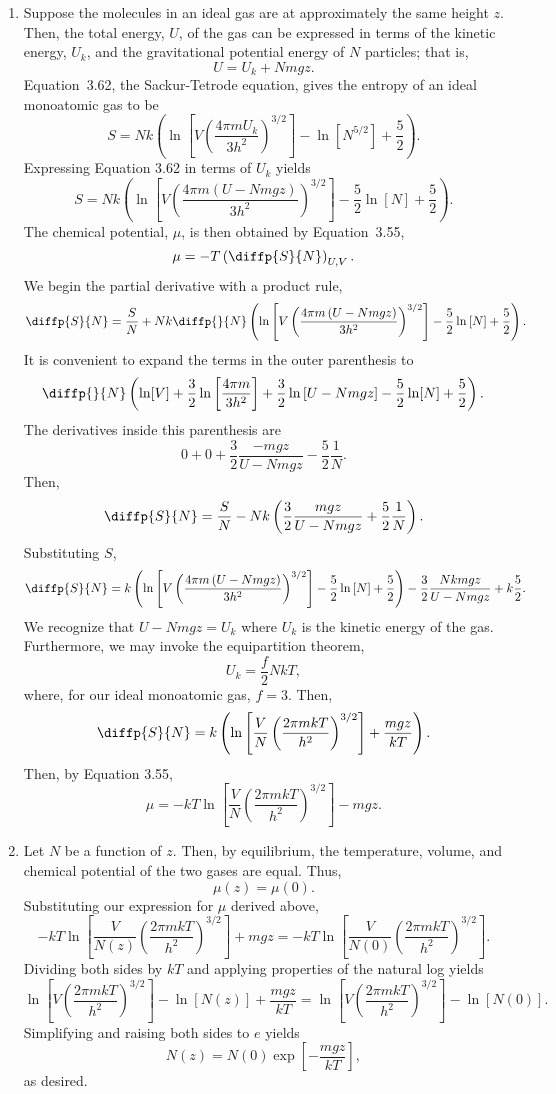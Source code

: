 \documentclass[a4paper, 12pt]{config/homework}
\begin{document}
\begin{enumerate}[label=\textbf{(\alph*)}]
\item Suppose the molecules in an ideal gas are at approximately the same height \(z\). Then, the total energy, \(U\), of the gas can be expressed in terms of the kinetic energy, \(U_k\), and the gravitational potential energy of \(N\) particles; that is,
\[U = U_k + Nmgz.\]
Equation~3.62, the Sackur-Tetrode equation, gives the entropy of an ideal monoatomic gas to be
\[S = Nk\left(\ln\left[V\left(\frac{4\pi m U_k}{3h^2}\right)^{3/2}\right] - \ln\left[N^{5/2}\right]+\frac{5}{2}\right).\]
Expressing Equation 3.62 in terms of \(U_k\) yields
\[S = Nk\left(\ln\left[V\left(\frac{4\pi m \left(U - Nmgz\right)}{3h^2}\right)^{3/2}\right] - \frac{5}{2}\ln\left[N\right]+\frac{5}{2}\right).\]
The chemical potential, \(\mu\), is then obtained by Equation~3.55,
\[\mu = -T\left(\diffp{S}{N}\right)_{U,V}.\]
We begin the partial derivative with a product rule,
\[\diffp{S}{N} = \frac{S}{N} + Nk\diffp{}{N}\left(\ln\left[V\left(\frac{4\pi m \left(U - Nmgz\right)}{3h^2}\right)^{3/2}\right] - \frac{5}{2}\ln\left[N\right]+\frac{5}{2}\right).\]
It is convenient to expand the terms in the outer parenthesis to
\[\diffp{}{N}\left(\ln[V] + \frac{3}{2}\ln\left[\frac{4\pi m}{3h^2}\right] + \frac{3}{2}\ln\left[U - Nmgz\right] - \frac{5}{2}\ln[N] + \frac{5}{2}\right).\]
The derivatives inside this parenthesis are
\[0 + 0 + \frac{3}{2}\frac{-mgz}{U - Nmgz} - \frac{5}{2}\frac{1}{N}.\]
Then,
\[\diffp{S}{N} = \frac{S}{N} - Nk\left(\frac{3}{2}\frac{mgz}{U-Nmgz} + \frac{5}{2}\frac{1}{N}\right).\]
Substituting \(S\),
\[\diffp{S}{N} = k\left(\ln\left[V\left(\frac{4\pi m \left(U - Nmgz\right)}{3h^2}\right)^{3/2}\right] - \frac{5}{2}\ln\left[N\right]+\frac{5}{2}\right)
- \frac{3}{2}\frac{Nkmgz}{U-Nmgz} + k\frac{5}{2}.\]
We recognize that \(U-Nmgz = U_k\) where \(U_k\) is the kinetic energy of the gas. Furthermore, we may invoke the equipartition theorem,
\[U_k = \frac{f}{2}NkT,\]
where, for our ideal monoatomic gas, \(f=3\).
Then,
\[\diffp{S}{N} = k\left(\ln\left[\frac{V}{N}\left(\frac{2\pi m kT}{h^2}\right)^{3/2}\right] + \frac{mgz}{kT}\right).\]
Then, by Equation 3.55,
\[\mu = -kT\ln\left[\frac{V}{N}\left(\frac{2\pi m k T}{h^2}\right)^{3/2}\right] - mgz.\]

\pagebreak
\item Let \(N\) be a function of \(z\). Then, by equilibrium, the temperature, volume, and chemical potential of the two gases are equal. Thus,
\[\mu(z) = \mu(0).\]
Substituting our expression for \(\mu\) derived above,
\[-kT\ln\left[\frac{V}{N(z)}\left(\frac{2\pi m k T}{h^2}\right)^{3/2}\right] + mgz = -kT\ln\left[\frac{V}{N(0)}\left(\frac{2 \pi m k T}{h^2}\right)^{3/2}\right].\]
Dividing both sides by \(kT\) and applying properties of the natural log yields
\[\ln\left[V\left(\frac{2\pi m k T}{h^2}\right)^{3/2}\right] - \ln\left[N(z)\right] + \frac{mgz}{kT} = \ln\left[V\left(\frac{2\pi m k T}{h^2}\right)^{3/2}\right] - \ln\left[N(0)\right].\]
Simplifying and raising both sides to \(e\) yields
\[N(z) = N(0)\exp\left[-\frac{mgz}{kT}\right],\]
as desired.
\end{enumerate}
\end{document}
